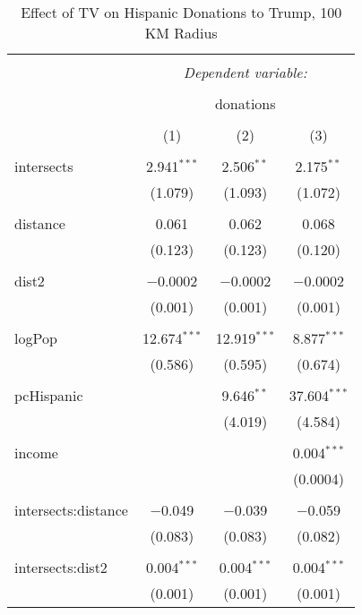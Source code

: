 
\begin{table}[!htbp] \centering 
  \caption{Effect of TV on Hispanic Donations to Trump, 100 KM Radius} 
  \label{} 
\begin{tabular}{@{\extracolsep{-5pt}}lccc} 
\\[-1.8ex]\hline 
\hline \\[-1.8ex] 
 & \multicolumn{3}{c}{\textit{Dependent variable:}} \\ 
\cline{2-4} 
\\[-1.8ex] & \multicolumn{3}{c}{donations} \\ 
\\[-1.8ex] & (1) & (2) & (3)\\ 
\hline \\[-1.8ex] 
 intersects & 2.941$^{***}$ & 2.506$^{**}$ & 2.175$^{**}$ \\ 
  & (1.079) & (1.093) & (1.072) \\ 
  & & & \\ 
 distance & 0.061 & 0.062 & 0.068 \\ 
  & (0.123) & (0.123) & (0.120) \\ 
  & & & \\ 
 dist2 & $-$0.0002 & $-$0.0002 & $-$0.0002 \\ 
  & (0.001) & (0.001) & (0.001) \\ 
  & & & \\ 
 logPop & 12.674$^{***}$ & 12.919$^{***}$ & 8.877$^{***}$ \\ 
  & (0.586) & (0.595) & (0.674) \\ 
  & & & \\ 
 pcHispanic &  & 9.646$^{**}$ & 37.604$^{***}$ \\ 
  &  & (4.019) & (4.584) \\ 
  & & & \\ 
 income &  &  & 0.004$^{***}$ \\ 
  &  &  & (0.0004) \\ 
  & & & \\ 
 intersects:distance & $-$0.049 & $-$0.039 & $-$0.059 \\ 
  & (0.083) & (0.083) & (0.082) \\ 
  & & & \\ 
 intersects:dist2 & 0.004$^{***}$ & 0.004$^{***}$ & 0.004$^{***}$ \\ 
  & (0.001) & (0.001) & (0.001) \\ 

\end{tabular}
\end{table}
